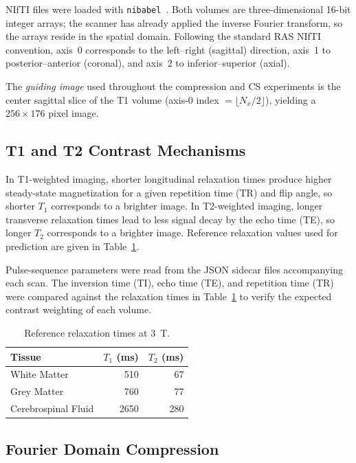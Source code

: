 \documentclass[10pt]{article}
\begin{document}
NIfTI files were loaded with \texttt{nibabel}~\cite{nibabel}.  Both volumes
are three-dimensional 16-bit integer arrays; the scanner has already applied
the inverse Fourier transform, so the arrays reside in the spatial domain.
Following the standard RAS NIfTI convention, axis~0 corresponds to the
left--right (sagittal) direction, axis~1 to posterior--anterior (coronal),
and axis~2 to inferior--superior (axial).

The \emph{guiding image} used throughout the compression and CS experiments
is the center sagittal slice of the T1 volume (axis-0 index
$= \lfloor N_x/2\rfloor$), yielding a $256\times 176$ pixel image.

\subsection{T1 and T2 Contrast Mechanisms}

In T1-weighted imaging, shorter longitudinal relaxation times produce higher
steady-state magnetization for a given repetition time (TR) and flip angle,
so shorter $T_1$ corresponds to a brighter image.  In T2-weighted imaging,
longer transverse relaxation times lead to less signal decay by the echo time
(TE), so longer $T_2$ corresponds to a brighter image.  Reference relaxation
values used for prediction are given in Table~\ref{tab:tissue}.

Pulse-sequence parameters were read from the JSON sidecar files accompanying
each scan.  The inversion time (TI), echo time (TE), and repetition time (TR)
were compared against the relaxation times in Table~\ref{tab:tissue} to
verify the expected contrast weighting of each volume.

\begin{table}[h]
\centering
\caption{Reference relaxation times at 3~T.}
\label{tab:tissue}
\begin{tabular}{lrr}
\toprule
Tissue & $T_1$ (ms) & $T_2$ (ms) \\
\midrule
White Matter        & 510  & 67  \\
Grey Matter         & 760  & 77  \\
Cerebrospinal Fluid & 2650 & 280 \\
\bottomrule
\end{tabular}
\end{table}

\subsection{Fourier Domain Compression}
\end{document}

